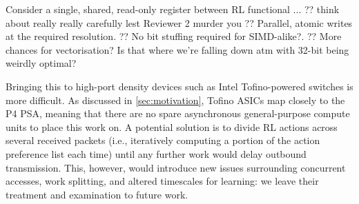 \documentclass[sigconf,natbib=false]{acmart}
\begin{document}
Consider a single, shared, read-only register between RL functional ...
?? think about really really carefully lest Reviewer 2 murder you
?? Parallel, atomic writes at the required resolution.
?? No bit stuffing required for SIMD-alike?.
?? More chances for vectorisation? Is that where we're falling down atm with 32-bit being weirdly optimal?

Bringing this to high-port density devices such as Intel Tofino-powered switches is more difficult.
As discussed in \cref{sec:motivation}, Tofino ASICs map closely to the P4 PSA, meaning that there are no spare asynchronous general-purpose compute units to place this work on.
A potential solution is to divide RL actions across several received packets (i.e., iteratively computing a portion of the action preference list each time) until any further work would delay outbound transmission.
This, however, would introduce new issues surrounding concurrent accesses, work splitting, and altered timescales for learning: we leave their treatment and examination to future work.
\end{document}

